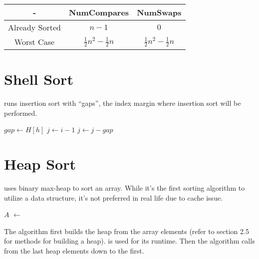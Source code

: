 \begin{center}
  \begin{tabular}{ | c | c | c | }
    \hline
    - & NumCompares & NumSwaps \\
    \hline
    Already Sorted & $n - 1$ & $0$ \\
    \hline
    Worst Case &  $\frac{1}{2} n^2 - \frac{1}{2} n$ & $\frac{1}{2} n^2 - \frac{1}{2} n$ \\
    \hline
  \end{tabular}
\end{center}

\section{Shell Sort}

 runs insertion sort with ``gaps'', the index margin where insertion sort will be performed.

\noindent \hrulefill
\begin{algorithmic}[1]
   
      \State $gap \gets H[h]$
        \State $j \gets i - 1$
            \State {}
            \State $j \gets j - gap$
          \EndIf
        \EndWhile
      \EndFor
    \EndFor
    \State {}
  \EndFunction
\end{algorithmic}
\noindent \hrulefill

\section{Heap Sort}

 uses binary max-heap to sort an array. While it's the first sorting algorithm to utilize a data structure, it's not preferred in real life due to cache issue.

\noindent \hrulefill
\begin{algorithmic}[1]
   
    \State $A$ $\gets$ 
      \State {}
    \EndFor
    \State {}
  \EndFunction
\end{algorithmic}
\noindent \hrulefill

The algorithm first builds the heap from the array elements (refer to section 2.5 for methods for building a heap).  is used for its runtime. Then the algorithm calls  from the last heap elements down to the first.

